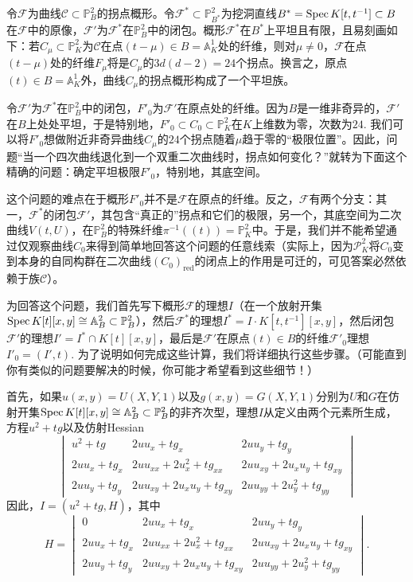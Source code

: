 令$\mathscr F$为曲线$\mathscr C\subset \mathbb P_B^2$的拐点概形。令$\mathscr F^*\subset \mathbb P_{B^*}^2$为挖洞直线$B^*=\operatorname{Spec} K[t,t^{-1}]\subset B$在$\mathscr F$中的原像，$\mathscr F'$为$\mathscr F^*$在$\mathbb P_B^2$中的闭包。概形$\mathscr F^*$在$B^*$上平坦且有限，且易刻画如下：若$C_\mu\subset \mathbb P_K^2$为$\mathscr C$在点$(t-\mu)\in B=\mathbb A_K^1$处的纤维，则对$\mu\neq 0$，$\mathscr F$在点$(t-\mu)$处的纤维$F_\mu$将是$C_\mu$的$3d(d-2)=24$个拐点。换言之，原点$(t)\in B=\mathbb A_K^1$外，曲线$C_\mu$的拐点概形构成了一个平坦族。

令$\mathscr F'$为$\mathscr F^*$在$\mathbb P_B^2$中的闭包，$F'_0$为$\mathscr F'$在原点处的纤维。因为$B$是一维非奇异的，$\mathscr F'$在$B$上处处平坦，于是特别地，$F'_0\subset C_0\subset \mathbb P_K^2$在$K$上维数为零，次数为$24$. 我们可以将$F'_0$想做附近非奇异曲线$C_\mu$的$24$个拐点随着$\mu$趋于零的“极限位置”。因此，\naive 问题“当一个四次曲线退化到一个双重二次曲线时，拐点如何变化？”就转为下面这个精确的问题：确定平坦极限$F'_0$，特别地，其底空间。

这个问题的难点在于概形$F'_0$并不是$\mathscr F$在原点的纤维。反之，$\mathscr F$有两个分支：其一，$\mathscr F^*$的闭包$\mathscr F'$，其包含“真正的”拐点和它们的极限，另一个，其底空间为二次曲线$V(t,U)$，在$\mathbb P_B^2$的特殊纤维$\pi^{-1}((t))=\mathbb P_K^2$中。于是，我们并不能希望通过仅观察曲线$C_0$来得到简单地回答这个问题的任意线索（实际上，因为$\mathscr P_K^2$将$C_0$变到本身的自同构群在二次曲线$(C_0)_{\text{red}}$的闭点上的作用是可迁的，可见答案必然依赖于族$\mathscr C$）。

为回答这个问题，我们首先写下概形$\mathscr F$的理想$I$（在一个放射开集$\operatorname{Spec} K[t][x,y]\cong \mathbb A_B^2\subset \mathbb P_B^2$），然后$\mathscr F^*$的理想$I^*=I\cdot K[t,t^{-1}][x,y]$，然后闭包$\mathscr F'$的理想$I'=I^*\cap K[t][x,y]$，最后是$\mathscr F'$在原点$(t)\in B$的纤维$\mathscr F'_0$理想$I'_0=(I',t)$. 为了说明如何完成这些计算，我们将详细执行这些步骤。（可能直到你有类似的问题要解决的时候，你可能才希望看到这些细节！）

首先，如果$u(x,y)=U(X,Y,1)$以及$g(x,y)=G(X,Y,1)$分别为$U$和$G$在仿射开集$\operatorname{Spec} K[t][x,y]\cong \mathbb A_B^2\subset \mathbb P_B^2$的非齐次型，理想$I$从定义由两个元素所生成，方程$u^2+tg$以及仿射Hessian
\[
	\begin{vmatrix}
		u^2+tg & 2uu_x+tg_x & 2uu_y+tg_y\\
		2uu_x+tg_x&2uu_{xx}+2u_x^2+tg_{xx}&2uu_{xy}+2u_xu_y+tg_{xy}\\
		2uu_y+tg_y&2uu_{xy}+2u_xu_y+tg_{xy}&2uu_{yy}+2u_y^2+tg_{yy}
	\end{vmatrix}
\]
因此，$I=(u^2+tg,H)$，其中
\[
	H=
	\begin{vmatrix}
		0 & 2uu_x+tg_x & 2uu_y+tg_y\\
		2uu_x+tg_x&2uu_{xx}+2u_x^2+tg_{xx}&2uu_{xy}+2u_xu_y+tg_{xy}\\
		2uu_y+tg_y&2uu_{xy}+2u_xu_y+tg_{xy}&2uu_{yy}+2u_y^2+tg_{yy}
	\end{vmatrix}.
\]

